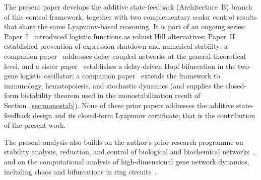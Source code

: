 \documentclass[12pt]{article}
\begin{document}
The present paper develops the additive state-feedback (Architecture~B)
branch of this control framework, together with two complementary scalar
control results that share the same Lyapunov-based reasoning. It is part
of an ongoing series: Paper~I~\cite{belgacem2025exploring} introduced
logistic functions as robust Hill alternatives; Paper~II~\cite{belgacem2026logistic}
established prevention of expression shutdown and numerical stability;
a companion paper~\cite{belgacem2026beyond} addresses delay-coupled
networks at the general theoretical level, and a sister
paper~\cite{belgacem2026sustained} establishes a delay-driven Hopf
bifurcation in the two-gene logistic oscillator; a companion
paper~\cite{belgacem2026extensions} extends the
framework to immunology, hematopoiesis, and stochastic dynamics (and
supplies the closed-form bistability theorem used in the
monostabilization result of Section~\ref{sec:monostab}). None of these prior papers addresses
the additive state-feedback design and its closed-form Lyapunov
certificate; that is the contribution of the present work.

The present analysis also builds on the author's prior research
programme on stability analysis, reduction, and control of biological
and biochemical
networks~\cite{belgacem2018reduction,belgacem2014cdc,belgacem2014mtns,belgacem2013cab,belgacem2013cdc,belgacem2013acta,belgacem2012ifac,belgacem2014med},
and on the computational analysis of high-dimensional gene network
dynamics, including chaos and bifurcations in ring
circuits~\cite{belgacem2025glass,farcot2019chaos}.
\end{document}
